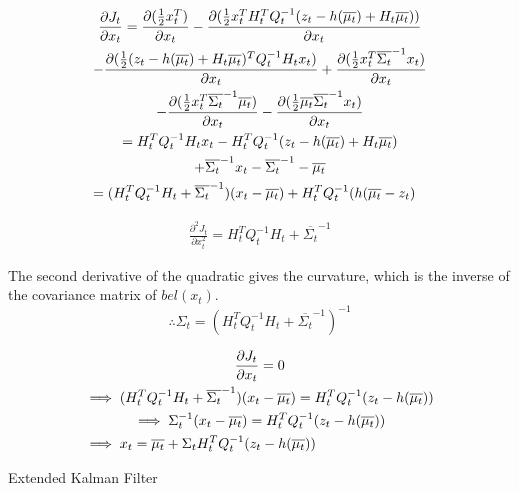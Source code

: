 \begin{multline}
\frac{\partial J_t}{\partial x_t} = \frac{\partial (\frac{1}{2} x_t^T )}{\partial x_t} - \frac{\partial (\frac{1}{2} x_t^T H_t^T Q_t^{-1} (z_t - h(\overline{\mu_t}) + H_t \overline{\mu_t}))}{\partial x_t} \\
- \frac{\partial (\frac{1}{2} (z_t - h(\overline{\mu_t}) + H_t \overline{\mu_t})^T Q_t^{-1} H_t x_t)}{\partial x_t} + \frac{\partial (\frac{1}{2} x_t^T \overline{\Sigma_t}^{-1} x_t)}{\partial x_t} \\
- \frac{\partial (\frac{1}{2} x_t^T \overline{\Sigma_t}^{-1} \overline{\mu_t})}{\partial x_t} - \frac{\partial (\frac{1}{2} \overline{\mu_t} \overline{\Sigma_t}^{-1} x_t )}{\partial x_t} \\
= H_t^T Q_t^{-1} H_t x_t - H_t^T Q_t^{-1} (z_t - h(\overline{\mu_t}) + H_t \overline{\mu_t}) \\
+ \overline{\Sigma_t}^{-1} x_t - \overline{\Sigma_t}^{-1} - \overline{\mu_t} \\
= (H_t^T Q_t^{-1} H_t + \overline{\Sigma_t}^{-1}) (x_t - \overline{\mu_t}) + H_t^TQ_t^{-1}(h(\overline{\mu_t} - z_t) \hfill
\end{multline}

\begin{multline}
\frac{\partial^2 J_t}{\partial x_t^2} = H_t^T Q_t^{-1} H_t + \overline{\Sigma_t}^{-1}
\end{multline}

The second derivative of the quadratic gives the curvature, which is the inverse of the covariance matrix of \(bel(x_t)\).
\[
\therefore \Sigma_t = (H_t^T Q_t^{-1} H_t + \overline{\Sigma_t}^{-1})^{-1}
\]

\begin{multline}
\frac{\partial J_t}{\partial x_t} = 0 \\
\implies (H_t^T Q_t^{-1} H_t + \overline{\Sigma_t}^{-1}) (x_t - \overline{\mu_t}) = H_t^TQ_t^{-1}(z_t - h(\overline{\mu_t})) \\
\implies \Sigma_t^{-1} (x_t - \overline{\mu_t}) = H_t^TQ_t^{-1}(z_t - h(\overline{\mu_t})) \\
\implies x_t = \overline{\mu_t} + \Sigma_t H_t^TQ_t^{-1}(z_t - h(\overline{\mu_t})) \hfill
\end{multline}

\begin{algorithm} 
	\caption{Extended Kalman Filter}
	\label{alg:EKFnonOptimal}
	\begin{algorithmic}[1]
		\State {}
		\EndFunction
	\end{algorithmic}
\end{algorithm}


